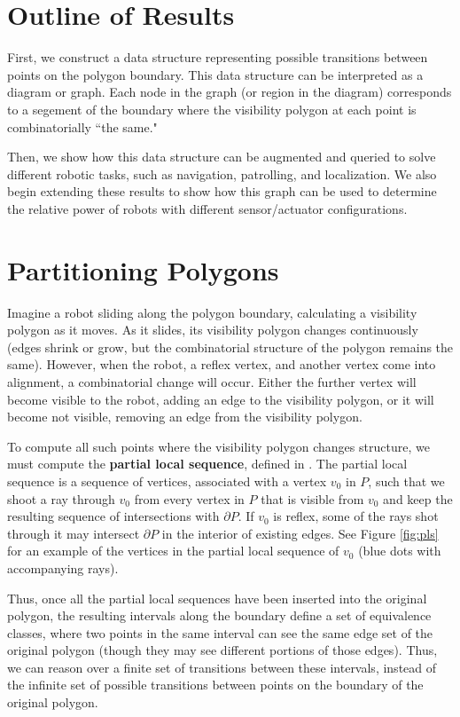 \documentclass[]{styles/svproc}  %
\begin{document}
\section{Outline of Results}

First, we construct a data structure representing possible transitions between points on
the polygon boundary. This data structure can be interpreted as a diagram or graph. 
Each node in the graph (or region in the diagram) corresponds to a segement of the
boundary where the visibility polygon at each point is combinatorially ``the
same."

Then, we show how this data structure can be augmented and queried to solve different
robotic tasks, such as navigation, patrolling, and localization. We also begin
extending these results to show how this graph can be used to determine the
relative power of robots with different sensor/actuator configurations.

\section{Partitioning Polygons}

Imagine a robot sliding along the polygon boundary, calculating a visibility
polygon as it moves. As it
slides, its visibility polygon changes continuously (edges shrink or grow, but
the combinatorial structure of the polygon remains the same). However, when
the robot, a reflex vertex, and another vertex come into alignment, a
combinatorial change will occur. Either the further vertex will become visible
to the robot, adding an edge to the visibility polygon, or it will become not
visible, removing an edge from the visibility polygon.

To compute all such points where the visibility polygon changes structure, we
must compute the \textbf{partial local sequence}, defined in \cite{rourke_viz}.
The partial local sequence is a sequence of vertices, associated with a vertex
$v_0$ in $P$, such that we shoot a ray through $v_0$ from every vertex in $P$
that is visible from $v_0$ and keep the resulting sequence of intersections with
$\partial P$. If $v_0$ is reflex, some of the rays shot through it may intersect
$\partial P$ in the interior of existing edges. See Figure \ref{fig:pls} for an
example of the vertices in the partial local sequence of $v_0$ (blue dots with
accompanying rays).

Thus, once all the partial local sequences have been inserted into the original
polygon, the resulting intervals along the boundary define a set of equivalence
classes, where two points in the same interval can see the same edge set of the
original polygon (though they may see different portions of those edges). Thus,
we can reason over a finite set of transitions between these intervals, instead
of the infinite set of possible transitions between points on the boundary of
the original polygon.
\end{document}
